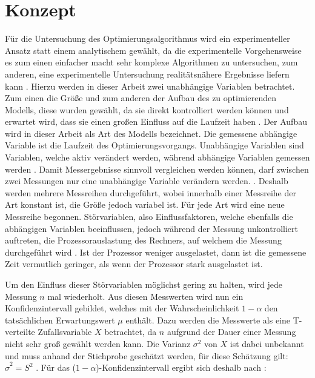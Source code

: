 \chapter{Konzept}

Für die Untersuchung des Optimierungsalgorithmus wird ein experimenteller
Ansatz statt einem analytischem gewählt, da die experimentelle Vorgehensweise
es zum einen einfacher macht sehr komplexe Algorithmen zu untersuchen, zum
anderen, eine experimentelle Untersuchung realitätsnähere Ergebnisse liefern
kann \autocite[vgl.][3]{ExperimentalMethods}. Hierzu werden in dieser Arbeit
zwei unabhängige Variablen betrachtet. Zum einen die Größe und zum anderen der
Aufbau des zu optimierenden Modells, diese wurden gewählt, da sie direkt
kontrolliert werden können und erwartet wird, dass sie einen großen Einfluss
auf die Laufzeit haben \autocite[vgl.][506]{ExperimentalAnalysis}. Der Aufbau
wird in dieser Arbeit als Art des Modells bezeichnet. Die gemessene abhängige
Variable ist die Laufzeit des Optimierungsvorgangs. Unabhängige Variablen sind
Variablen, welche aktiv verändert werden, während abhängige Variablen gemessen
werden \autocite[vgl.][236]{EmpirischeMethoden}. Damit Messergebnisse
sinnvoll vergleichen werden können, darf zwischen zwei Messungen nur eine
unabhängige Variable verändern werden. \autocite[vgl.][236]{EmpirischeMethoden}.
Deshalb werden mehrere Messreihen durchgeführt, wobei innerhalb einer Messreihe
der Art konstant ist, die Größe jedoch variabel ist. Für jede Art wird eine
neue Messreihe begonnen. Störvariablen, also Einflussfaktoren, welche ebenfalls
die abhängigen Variablen beeinflussen, jedoch während der Messung
unkontrolliert auftreten, \zB die Prozessorauslastung des Rechners, auf
welchem die Messung durchgeführt wird \autocite[vgl.][237]{EmpirischeMethoden}.
Ist der Prozessor weniger ausgelastet, dann ist die gemessene Zeit vermutlich
geringer, als wenn der Prozessor stark ausgelastet ist.

Um den Einfluss dieser Störvariablen möglichst gering zu halten, wird jede Messung
$n$ mal wiederholt. Aus diesen Messwerten wird nun ein Konfidenzintervall
gebildet, welches mit der Wahrscheinlichkeit $1 - \alpha$ den tatsächlichen
Erwartungswert $\mu$ enthält. Dazu werden die Messwerte als eine T-verteilte
Zufallsvariable $X$ betrachtet, da $n$ aufgrund der Dauer einer Messung nicht
sehr groß gewählt werden kann. Die Varianz $\sigma^2$ von $X$ ist dabei
unbekannt und muss anhand der Stichprobe geschätzt werden, für diese Schätzung
gilt: $\hat{\sigma}^2 = S^2$ \autocite[vgl][528]{Statistik}. Für das
($1-\alpha$)-Konfidenzintervall ergibt sich deshalb nach
\autocite[vgl.][533]{Statistik}:

